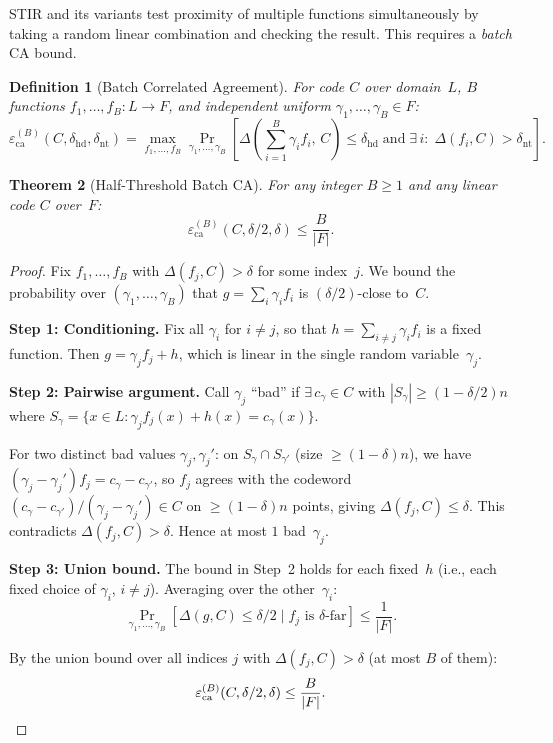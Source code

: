 \documentclass[11pt]{article}
\newtheorem{theorem}{Theorem}
\newtheorem{definition}[theorem]{Definition}
\begin{document}
STIR and its variants test proximity of multiple functions simultaneously by taking a random linear combination and checking the result. This requires a \emph{batch} CA bound.

\begin{definition}[Batch Correlated Agreement]
\label{def:batch-ca}
For code $C$ over domain~$L$, $B$ functions $f_1, \ldots, f_B: L \to F$, and independent uniform $\gamma_1, \ldots, \gamma_B \in F$:
$$\varepsilon_{\mathrm{ca}}^{(B)}(C, \delta_{\mathrm{hd}}, \delta_{\mathrm{nt}}) = \max_{f_1, \ldots, f_B} \Pr_{\gamma_1, \ldots, \gamma_B}\!\!\left[\Delta\!\left(\sum_{i=1}^B \gamma_i f_i,\, C\right) \leq \delta_{\mathrm{hd}} \;\text{and}\; \exists\, i:\; \Delta(f_i, C) > \delta_{\mathrm{nt}}\right].$$
\end{definition}

\begin{theorem}[Half-Threshold Batch CA]
\label{thm:batch-ca}
For any integer $B \geq 1$ and any linear code $C$ over~$F$:
$$\varepsilon_{\mathrm{ca}}^{(B)}(C, \delta/2, \delta) \leq \frac{B}{|F|}.$$
\end{theorem}

\begin{proof}
Fix $f_1, \ldots, f_B$ with $\Delta(f_j, C) > \delta$ for some index~$j$. We bound the probability over $(\gamma_1, \ldots, \gamma_B)$ that $g = \sum_i \gamma_i f_i$ is $(\delta/2)$-close to~$C$.

\textbf{Step 1: Conditioning.} Fix all $\gamma_i$ for $i \neq j$, so that $h = \sum_{i \neq j} \gamma_i f_i$ is a fixed function. Then $g = \gamma_j f_j + h$, which is linear in the single random variable~$\gamma_j$.

\textbf{Step 2: Pairwise argument.} Call $\gamma_j$ ``bad'' if $\exists\, c_\gamma \in C$ with $|S_\gamma| \geq (1-\delta/2)n$ where $S_\gamma = \{x \in L : \gamma_j f_j(x) + h(x) = c_\gamma(x)\}$.

For two distinct bad values $\gamma_j, \gamma_j'$: on $S_\gamma \cap S_{\gamma'}$ (size $\geq (1{-}\delta)n$), we have $(\gamma_j - \gamma_j') f_j = c_\gamma - c_{\gamma'}$, so $f_j$ agrees with the codeword $(c_\gamma - c_{\gamma'})/(\gamma_j - \gamma_j') \in C$ on $\geq (1{-}\delta)n$ points, giving $\Delta(f_j, C) \leq \delta$. This contradicts $\Delta(f_j, C) > \delta$. Hence at most $1$ bad~$\gamma_j$.

\textbf{Step 3: Union bound.} The bound in Step~2 holds for each fixed~$h$ (i.e., each fixed choice of $\gamma_i$, $i \neq j$). Averaging over the other~$\gamma_i$:
$$\Pr_{\gamma_1, \ldots, \gamma_B}[\Delta(g, C) \leq \delta/2 \mid \text{$f_j$ is $\delta$-far}] \leq \frac{1}{|F|}.$$

By the union bound over all indices $j$ with $\Delta(f_j, C) > \delta$ (at most $B$ of them):
$$\varepsilon_{\mathrm{ca}}^{(B)}(C, \delta/2, \delta) \leq \frac{B}{|F|}. \qedhere$$
\end{proof}
\end{document}
